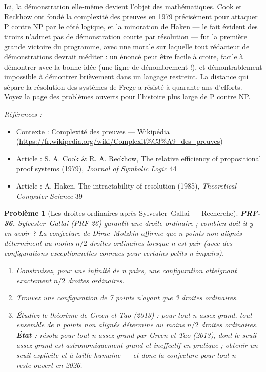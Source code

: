 \documentclass[11pt]{article}
\newtheorem{problem}{Problème}
\newenvironment{refs}{\par\small\noindent\emph{Références :}\begin{itemize}\setlength\itemsep{0pt}}{\end{itemize}\normalsize}
\begin{document}
\noindent Ici, la démonstration elle-même devient l'objet des mathématiques. Cook et
Reckhow ont fondé la complexité des preuves en 1979 précisément pour attaquer P contre NP par
le côté logique, et la minoration de Haken --- le fait \og{} évident \fg{} des tiroirs n'admet pas de
démonstration courte par résolution --- fut la première grande victoire du programme, avec une
morale sur laquelle tout rédacteur de démonstrations devrait méditer : un énoncé peut être
facile à croire, facile à démontrer avec la bonne idée (une ligne de dénombrement !), et
démontrablement impossible à démontrer brièvement dans un langage restreint. La distance qui
sépare la résolution des systèmes de Frege a résisté à quarante ans d'efforts. Voyez la page
des problèmes ouverts pour l'histoire plus large de P contre NP.

\begin{refs}
\item Contexte : Complexité des preuves --- Wikipédia (\url{https://fr.wikipedia.org/wiki/Complexit%C3%A9_des_preuves})
\item Article : S. A. Cook \& R. A. Reckhow, \og{} The relative efficiency of propositional proof systems \fg{} (1979), \textit{Journal of Symbolic Logic} 44
\item Article : A. Haken, \og{} The intractability of resolution \fg{} (1985), \textit{Theoretical Computer Science} 39
\end{refs}

\bigskip

\begin{problem}[{Les droites ordinaires après Sylvester--Gallai --- Recherche}]
\textbf{PRF-36.} Sylvester--Gallai (PRF-26) garantit une droite ordinaire ; combien
doit-il y en avoir ? La conjecture de Dirac--Motzkin affirme que n points non alignés
déterminent au moins $ n/2 $ droites ordinaires lorsque n est pair (avec des
configurations exceptionnelles connues pour certains petits n impairs).
\begin{enumerate}
\item[(a)] Construisez, pour une infinité de n pairs, une
configuration atteignant exactement $ n/2 $ droites ordinaires.
\item[(b)] Trouvez une configuration de
7 points n'ayant que 3 droites ordinaires.
\item[(c)] Étudiez le théorème de Green et Tao (2013) : pour tout
n assez grand, tout ensemble de n points non alignés détermine au moins $ n/2 $
droites ordinaires. \textbf{État :} résolu pour tout n assez grand par Green et Tao
(2013), dont le seuil \og{} assez grand \fg{} est astronomiquement grand et ineffectif en
pratique ; obtenir un seuil explicite et à taille humaine --- et donc la conjecture pour
tout n --- reste ouvert en 2026.
\end{enumerate}

\end{problem}
\end{document}
